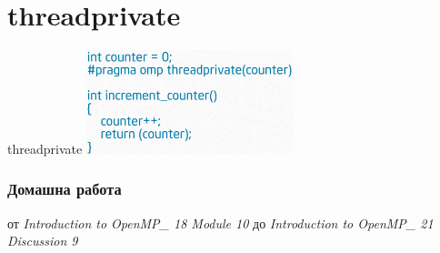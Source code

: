 \documentclass{beamer}
\begin{document}
\section{threadprivate}
\begin{frame}{threadprivate}
  \includegraphics[width=0.45\textwidth]{threadprivate}  
\end{frame}


\begin{frame}
  \frametitle{Домашна работа}
  от \textit{Introduction to OpenMP_ 18 Module 10} до \textit{Introduction to OpenMP_ 21 Discussion 9}

\end{frame}
\end{document}
